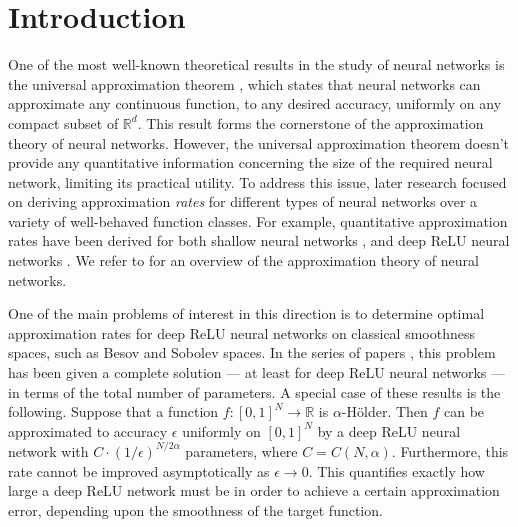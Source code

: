 \documentclass[twoside,11pt]{article}
\begin{document}
\section{Introduction}
One of the most well-known theoretical results in the study of neural networks is the universal approximation theorem \citep{cybenko1989approximation,carroll1989construction,gallant1992learning,irie1988capabilities,funahashi1989approximate,hornik1990universal}, which states that neural networks can approximate any continuous function,  to any desired accuracy, uniformly on any compact subset of $\mathbb{R}^d$. This result forms the cornerstone of the approximation theory of neural networks. However, the universal approximation theorem doesn't provide any quantitative information concerning the size of the required neural network, limiting its practical utility. To address this issue, later research focused on deriving approximation \emph{rates} for different types of neural networks over a variety of well-behaved function classes. For example,  quantitative approximation rates have been derived for both shallow neural networks \citep{barron2002universal,makovoz1996random,bach2017breaking,klusowski2018approximation,mhaskar1996neural,petrushev1998approximation,siegel2024sharp}, and deep ReLU neural networks \citep{yarotsky2017error,guhring2020error,petersen2018optimal,lu2021deep,shen2022optimal,siegel2023optimal}. We refer to \cite{devore2021neural} for an overview of the approximation theory of neural networks.

One of the main problems of interest in this direction is to determine optimal approximation rates for deep ReLU neural networks on classical smoothness spaces, such as Besov and Sobolev spaces. In the series of papers \cite{yarotsky2018optimal,shen2022optimal,lu2021deep,siegel2023optimal}, this problem has been given a complete solution --- at least for deep ReLU neural networks --- in terms of the total number of parameters. A special case of these results is the following. Suppose that a function $f:[0,1]^N\rightarrow \mathbb{R}$ is $\alpha$-H\"older. Then $f$ can be approximated to accuracy $\epsilon$ uniformly on $[0,1]^N$ by a deep ReLU neural network with $C\cdot (1/\epsilon)^{N/2\alpha}$ parameters, where $C=C(N,\alpha)$. Furthermore, this rate cannot be improved asymptotically as $\epsilon\rightarrow 0$. This quantifies exactly how large a deep ReLU network must be in order to achieve a certain approximation error, depending upon the smoothness of the target function.

\end{document}
